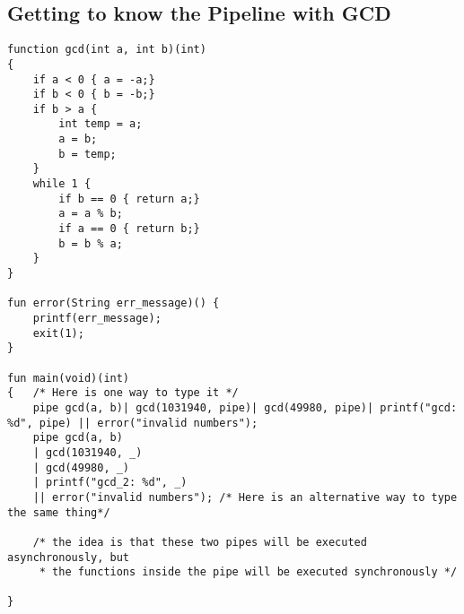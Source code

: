 \documentclass[./LRM_main.tex]{subfiles}
\begin{document}
\subsection{Getting to know the Pipeline with GCD}
\begin{lstlisting}
function gcd(int a, int b)(int)
{
	if a < 0 { a = -a;}
	if b < 0 { b = -b;}
	if b > a {
		int temp = a;
		a = b;
		b = temp;
	}
	while 1 {
		if b == 0 { return a;}
		a = a % b;
		if a == 0 { return b;}
		b = b % a;
	}
}

fun error(String err_message)() {
	printf(err_message);
	exit(1);
}

fun main(void)(int)
{	/* Here is one way to type it */
	pipe gcd(a, b)| gcd(1031940, pipe)| gcd(49980, pipe)| printf("gcd: %d", pipe) || error("invalid numbers");	
	pipe gcd(a, b)
	| gcd(1031940, _)
	| gcd(49980, _)
	| printf("gcd_2: %d", _)
	|| error("invalid numbers"); /* Here is an alternative way to type the same thing*/

	/* the idea is that these two pipes will be executed asynchronously, but
	 * the functions inside the pipe will be executed synchronously */

}

\end{lstlisting}
\end{document}
